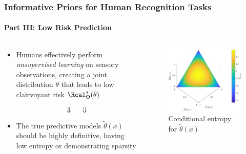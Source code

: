 \documentclass[aspectratio=169,usenames,dvipsnames]{beamer}
\begin{document}
\begin{frame}
\frametitle{Informative Priors for Human Recognition Tasks}
\framesubtitle{Part III: Low Risk Prediction}

\begin{columns}[c]

\begin{column}{.6\linewidth}

\begin{itemize}
\item Humans effectively perform \emph{unsupervised learning} on sensory observations, creating a joint distribution $\theta$ that leads to low clairvoyant risk $\Rcal_{\Theta}^*(\theta)$

\vspace{-1em}
\Large
\begin{equation*} 
\Downarrow \quad \Downarrow
\end{equation*}
\normalsize

\vspace{0.5em}
\item The true predictive models $\tilde{\theta}(x)$ should be highly definitive, having \alert{low entropy} or demonstrating \alert{sparsity}

\end{itemize}



\end{column}

\begin{column}{.4\linewidth}

\begin{figure}
\centering
\includegraphics[width=1\linewidth]{theta_tilde_entropy.pdf}
\caption{Conditional entropy for $\tilde{\theta}(x)$}
\label{fig:theta_tilde_entropy}
\end{figure}

\end{column}

\end{columns}

\end{frame}
\end{document}
